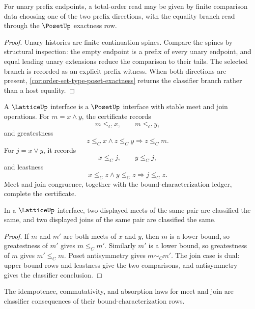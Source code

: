 \begin{theorem}
\label{thm:order-set-type-unary-comparison-data}
For unary prefix endpoints, a total-order read may be given by finite
comparison data choosing one of the two prefix directions, with the equality
branch read through the $\PosetUp$ exactness row.
\end{theorem}

\begin{proof}
Unary histories are finite continuation spines.  Compare the spines by
structural inspection: the empty endpoint is a prefix of every unary endpoint,
and equal leading unary extensions reduce the comparison to their tails.
The selected branch is recorded as an explicit prefix witness.  When both
directions are present, \autoref{cor:order-set-type-poset-exactness} returns
the classifier branch rather than a host equality.
\end{proof}

\begin{definition}
\label{def:order-set-type-lattice}
A $\LatticeUp$ interface is a $\PosetUp$ interface with stable meet and join
operations.  For $m=x\wedge y$, the certificate records
$$
m\le_C x,
\qquad
m\le_C y,
$$
and greatestness
$$
z\le_C x\wedge z\le_C y\Longrightarrow z\le_C m.
$$
For $j=x\vee y$, it records
$$
x\le_C j,
\qquad
y\le_C j,
$$
and leastness
$$
x\le_C z\wedge y\le_C z\Longrightarrow j\le_C z.
$$
Meet and join congruence, together with the bound-characterization ledger,
complete the certificate.
\end{definition}

\begin{theorem}
\label{thm:order-set-type-meet-join-uniqueness}
In a $\LatticeUp$ interface, two displayed meets of the same pair are
classified the same, and two displayed joins of the same pair are classified
the same.
\end{theorem}

\begin{proof}
If $m$ and $m'$ are both meets of $x$ and $y$, then $m$ is a lower bound, so
greatestness of $m'$ gives $m\le_C m'$.  Similarly $m'$ is a lower bound, so
greatestness of $m$ gives $m'\le_C m$.  Poset antisymmetry gives
$m\sim_C m'$.  The join case is dual: upper-bound rows and leastness give
the two comparisons, and antisymmetry gives the classifier conclusion.
\end{proof}

\begin{theorem}
\label{thm:order-set-type-lattice-laws-from-bounds}
The idempotence, commutativity, and absorption laws for meet and join are
classifier consequences of their bound-characterization rows.
\end{theorem}

